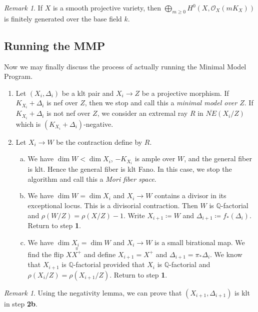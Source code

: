 \documentclass[leqno, openany]{memoir}
\theoremstyle{definition}
\theoremstyle{remark}
\newtheorem{rmk}[thm]{Remark}
\theoremstyle{plain}
\theoremstyle{definition}
\theoremstyle{remark}
\newcommand{\Q}{\mathbb{Q}}
\newcommand{\mc}[1]{\mathcal{#1}}
\newcommand{\ol}[1]{\overline{#1}}
\begin{document}
\begin{rmk}
    If $X$ is a smooth projective variety, then $\bigoplus_{m \geq 0} H^0(X, \mc{O}_X(mK_X))$ is finitely generated over the base field $k$.
\end{rmk}

\subsection{Running the MMP}%
\label{sub:running_the_mmp}

Now we may finally discuss the process of actually running the Minimal Model Program.

\begin{enumerate}
    \item Let $(X_i, \Delta_i)$ be a klt pair and $X_i \to Z$ be a projective morphism. If $K_{X_i} + \Delta_i$ is nef over $Z$, then we stop and call this a \textit{minimal model over $Z$}. If $K_{X_i} + \Delta_i$ is not nef over $Z$, we consider an extremal ray $R$ in $\ol{NE}(X_i / Z)$ which is $(K_{X_i} + \Delta_i)$-negative.
    \item Let $X_i \to W$ be the contraction define by $R$.
        \begin{enumerate}[(a)]
            \item We have $\dim W < \dim X_i$, $-K_{X_i}$ is ample over $W$, and the general fiber is klt. Hence the general fiber is klt Fano. In this case, we stop the algorithm and call this a \textit{Mori fiber space}.
            \item We have $\dim W = \dim X_i$ and $X_i \to W$ contains a divisor in its exceptional locus. This is a divisorial contraction. Then $W$ is $\Q$-factorial and $\rho(W/Z) = \rho(X/Z) - 1$. Write $X_{i+1} \coloneqq W$ and $\Delta_{i+1} \coloneqq f_*(\Delta_i)$. Return to step \textbf{1}.
            \item We have $\dim X_i = \dim W$ and $X_i \to W$ is a small birational map. We find the flip $X \overset{\pi}{X^+}$ and define $X_{i+1} = X^+$ and $\Delta_{i+1} = \pi_* \Delta_i$. We know that $X_{i+1}$ is $\Q$-factorial provided that $X_i$ is $\Q$-factorial and $\rho(X_i/Z) = \rho(X_{i+1}/Z)$. Return to step \textbf{1}.
        \end{enumerate}
\end{enumerate}

\begin{rmk}
    Using the negativity lemma, we can prove that $(X_{i+1}, \Delta_{i+1})$ is klt in step \textbf{2b}.
\end{rmk}
\end{document}
